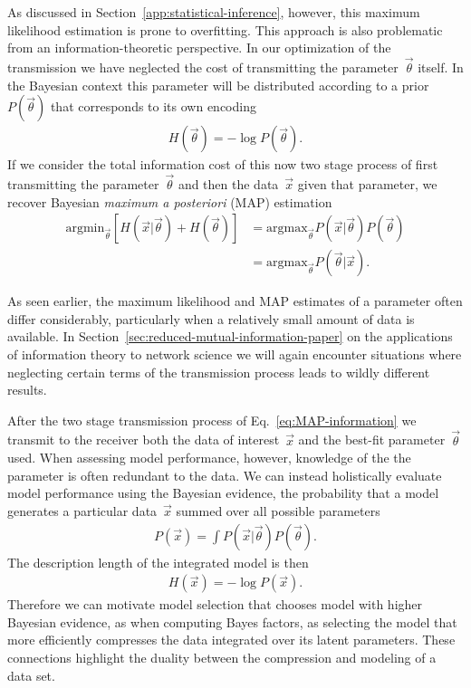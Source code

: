 As discussed in Section~\ref{app:statistical-inference}, however, this maximum likelihood estimation is prone to overfitting. This approach is also problematic from an information-theoretic perspective. In our optimization of the transmission we have neglected the cost of transmitting the parameter~$\vec{\theta}$ itself. In the Bayesian context this parameter will be distributed according to a prior~$P(\vec{\theta})$ that corresponds to its own encoding \begin{align}
    H(\vec{\theta}) = -\log P(\vec{\theta}). \label{eq:H-log-P-information}
\end{align}
If we consider the total information cost of this now two stage process of first transmitting the parameter~$\vec{\theta}$ and then the data~$\vec{x}$ given that parameter, we recover Bayesian \emph{maximum a posteriori} (MAP) estimation \begin{align}
    \text{argmin}_{\vec{\theta}} \left[H(\vec{x}|\vec{\theta}) + H(\vec{\theta})\right] &= \text{argmax}_{\vec{\theta}} P(\vec{x}|\vec{\theta})P(\vec{\theta})  \nonumber \\
    &= \text{argmax}_{\vec{\theta}} P(\vec{\theta}|\vec{x}). \label{eq:MAP-information}
\end{align}

As seen earlier, the maximum likelihood and MAP estimates of a parameter often differ considerably, particularly when a relatively small amount of data is available. In Section~\ref{sec:reduced-mutual-information-paper} on the applications of information theory to network science we will again encounter situations where neglecting certain terms of the transmission process leads to wildly different results.

After the two stage transmission process of Eq.~\eqref{eq:MAP-information} we transmit to the receiver both the data of interest~$\vec{x}$ and the best-fit parameter~$\vec{\theta}$ used. When assessing model performance, however, knowledge of the the parameter is often redundant to the data. We can instead holistically evaluate model performance using the Bayesian evidence, the probability that a model generates a particular data~$\vec{x}$ summed over all possible parameters \begin{align}
    P(\vec{x}) = \int P(\vec{x}|\vec{\theta})P(\vec{\theta}).
\end{align} 
The description length of the integrated model is then \begin{align}
    H(\vec{x}) = -\log P(\vec{x}).
\end{align}
Therefore we can motivate model selection that chooses model with higher Bayesian evidence, as when computing Bayes factors, as selecting the model that more efficiently compresses the data integrated over its latent parameters. These connections highlight the duality between the compression and modeling of a data set.

